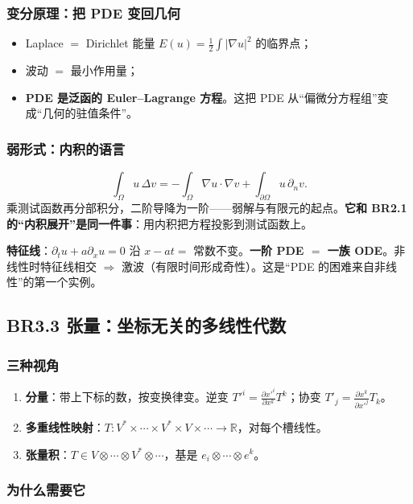 \subsubsection{变分原理：把 PDE 变回几何}

\begin{itemize}
  \item Laplace $=$ Dirichlet 能量 $E(u)=\frac12\int|\nabla u|^2$ 的临界点；
  \item 波动 $=$ 最小作用量；
  \item \textbf{PDE 是泛函的 Euler--Lagrange 方程}。这把 PDE 从“偏微分方程组”变成“几何的驻值条件”。
\end{itemize}

\subsubsection{弱形式：内积的语言}

\[
\int_\Omega u\,\Delta v=-\int_\Omega\nabla u\cdot\nabla v+\int_{\partial\Omega}u\,\partial_n v .
\]
乘测试函数再分部积分，二阶导降为一阶——弱解与有限元的起点。\textbf{它和 BR2.1 的“内积展开”是同一件事}：用内积把方程投影到测试函数上。

\textbf{特征线}：$\partial_tu+a\partial_xu=0$ 沿 $x-at=$ 常数不变。\textbf{一阶 PDE $=$ 一族 ODE}。非线性时特征线相交 $\Rightarrow$ 激波（有限时间形成奇性）。这是“PDE 的困难来自非线性”的第一个实例。

\subsection{BR3.3 张量：坐标无关的多线性代数}

\subsubsection{三种视角}

\begin{enumerate}
  \item \textbf{分量}：带上下标的数，按变换律变。逆变 $T'^i=\frac{\partial x'^i}{\partial x^k}T^k$；协变 $T'_j=\frac{\partial x^k}{\partial x'^j}T_k$。
  \item \textbf{多重线性映射}：$T:V^*\times\cdots\times V^*\times V\times\cdots\to\mathbb{R}$，对每个槽线性。
  \item \textbf{张量积}：$T\in V\otimes\cdots\otimes V^*\otimes\cdots$，基是 $e_i\otimes\cdots\otimes e^k$。
\end{enumerate}

\subsubsection{为什么需要它}

